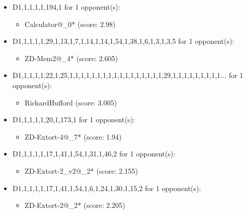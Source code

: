 \begin{appendices}
\begin{itemize}
    \item D1,1,1,1,1,194,1 for 1 opponent(s):
    \begin{multicols}{3}
         \begin{itemize}
            \item Calculator@\_0* (score: 2.98)
        \end{itemize}
     \end{multicols}
     
    \item D1,1,1,1,1,29,1,13,1,7,1,14,1,14,1,54,1,38,1,6,1,3,1,3,5 for 1 opponent(s):
    \begin{multicols}{3}
         \begin{itemize}
            \item ZD-Mem2@\_4* (score: 2.605)
        \end{itemize}
     \end{multicols}
     
    \item D1,1,1,1,1,22,1,25,1,1,1,1,1,1,1,1,1,1,1,1,1,1,1,1,1,29,1,1,1,1,1,1,1,1,1... for 1 opponent(s):
    \begin{multicols}{3}
         \begin{itemize}
            \item RichardHufford (score: 3.005)
        \end{itemize}
     \end{multicols}
     
    \item D1,1,1,1,1,20,1,173,1 for 1 opponent(s):
    \begin{multicols}{3}
         \begin{itemize}
            \item ZD-Extort-4@\_7* (score: 1.94)
        \end{itemize}
     \end{multicols}
     
    \item D1,1,1,1,1,17,1,41,1,54,1,31,1,46,2 for 1 opponent(s):
    \begin{multicols}{3}
         \begin{itemize}
            \item ZD-Extort-2\_v2@\_2* (score: 2.155)
        \end{itemize}
     \end{multicols}
     
    \item D1,1,1,1,1,17,1,41,1,54,1,6,1,24,1,30,1,15,2 for 1 opponent(s):
    \begin{multicols}{3}
         \begin{itemize}
            \item ZD-Extort-2@\_2* (score: 2.205)
        \end{itemize}
     \end{multicols}
     

\end{itemize}
\end{appendices}
